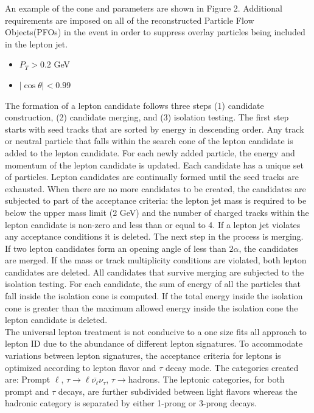 An example of the cone and parameters are shown in Figure 2. Additional requirements are imposed on all of the reconstructed Particle Flow Objects(PFOs) in the event in order to suppress overlay particles being included in the lepton jet.
\begin{itemize}
\item $P_T > 0.2$ GeV
\item $|\cos\theta| < 0.99$
\end{itemize}
The formation of a lepton candidate follows three steps (1) candidate construction, (2) candidate merging, and (3) isolation testing.
The first step starts with seed tracks that are sorted by energy in descending order. Any track or neutral particle that falls within the search cone of the lepton candidate is added to the lepton candidate. For each newly added particle, the energy and momentum of the lepton candidate is updated. Each candidate has a unique set of particles. Lepton candidates are continually formed until the seed tracks are exhausted. When there are no more candidates to be created, the candidates are subjected to part of the acceptance criteria: the lepton jet mass is required to be below the upper mass limit (2 GeV) and the number of charged tracks within the lepton candidate is non-zero and less than or equal to 4. If a lepton jet violates any acceptance conditions it is deleted. The next step in the process is merging. If two lepton candidates form an opening angle of less than $2\alpha$, the candidates are merged. If the mass or track multiplicity conditions are violated, both lepton candidates are deleted.  All  candidates that survive merging are subjected to the isolation testing. For each candidate, the sum of energy of all the particles that fall inside the isolation cone is computed. If the total energy inside the isolation cone is greater than the maximum allowed energy inside the isolation cone the lepton candidate is deleted.\\

	The universal lepton treatment is not conducive to a one size fits all approach to lepton ID due to the abundance of different lepton signatures. To accommodate variations between lepton signatures, the acceptance criteria for leptons is optimized according to lepton flavor and $\tau$ decay mode. The categories created are: Prompt $\ell$, $\tau \rightarrow \ell\bar{\nu_{\ell}} \nu_{\tau}$, $\tau \rightarrow $hadrons. The leptonic categories, for both prompt and $\tau$ decays, are further subdivided between light flavors whereas the hadronic category is separated by either 1-prong or 3-prong decays.\\


